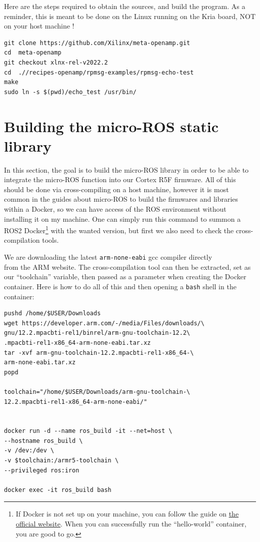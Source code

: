 \documentclass[10pt]{article}
\begin{document}
Here are the steps required to obtain the sources, and build the program.
As a reminder, this is meant to be done on the Linux running on the
Kria board, NOT on your host machine !
\begin{tcolorbox}
\begin{verbatim}
git clone https://github.com/Xilinx/meta-openamp.git
cd  meta-openamp
git checkout xlnx-rel-v2022.2
cd  .//recipes-openamp/rpmsg-examples/rpmsg-echo-test
make
sudo ln -s $(pwd)/echo_test /usr/bin/
\end{verbatim}
\end{tcolorbox}

\section{Building the micro-ROS static library}
In this section, the goal is to build the micro-ROS library in order to be
able to integrate the micro-ROS function into our Cortex R5F firmware.
All of this should be done via cross-compiling on a host machine, however
it is most common in the guides about micro-ROS to build the firmwares and libraries within a Docker,
so we can have access of the ROS environment without installing it on my machine.
One can simply run this command to summon a ROS2 Docker\footnote{If Docker is not set up on your machine, you can follow the guide on \href{https://docs.docker.com/engine/install/ubuntu/}{the official website}. When you can successfully run the ``hello-world'' container, you are good to go.} with the wanted version, but first we also need to check the cross-compilation tools.

We are downloading the latest \verb|arm-none-eabi| gcc compiler directly \\from the ARM website.
The cross-compilation tool can then be extracted, set as our ``toolchain'' variable, then passed as a parameter when creating the Docker container.
Here is how to do all of this and then opening a \verb|bash| shell in the container:
\begin{tcolorbox}
\begin{verbatim}
pushd /home/$USER/Downloads
wget https://developer.arm.com/-/media/Files/downloads/\
gnu/12.2.mpacbti-rel1/binrel/arm-gnu-toolchain-12.2\
.mpacbti-rel1-x86_64-arm-none-eabi.tar.xz
tar -xvf arm-gnu-toolchain-12.2.mpacbti-rel1-x86_64-\
arm-none-eabi.tar.xz
popd

toolchain="/home/$USER/Downloads/arm-gnu-toolchain-\
12.2.mpacbti-rel1-x86_64-arm-none-eabi/"


docker run -d --name ros_build -it --net=host \
--hostname ros_build \
-v /dev:/dev \
-v $toolchain:/armr5-toolchain \
--privileged ros:iron

docker exec -it ros_build bash
\end{verbatim}
\end{tcolorbox}
\end{document}
